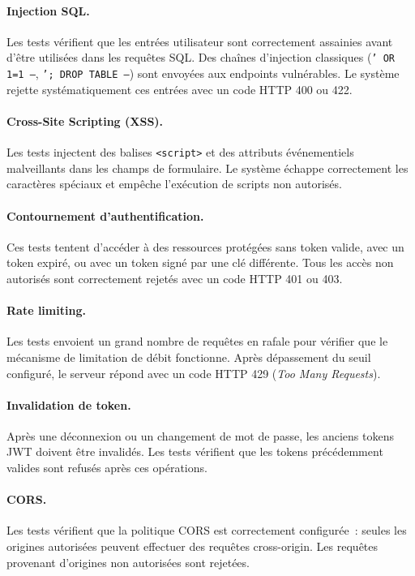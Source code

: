 \paragraph{Injection SQL.}
Les tests v\'{e}rifient que les entr\'{e}es utilisateur sont correctement
assainies avant d'\^{e}tre utilis\'{e}es dans les requ\^{e}tes SQL. Des cha\^{i}nes
d'injection classiques (\texttt{' OR 1=1 --}, \texttt{'; DROP TABLE --})
sont envoy\'{e}es aux endpoints vuln\'{e}rables. Le syst\`{e}me rejette
syst\'{e}matiquement ces entr\'{e}es avec un code HTTP 400 ou 422.

\paragraph{Cross-Site Scripting (XSS).}
Les tests injectent des balises \texttt{<script>} et des attributs
\'{e}v\'{e}nementiels malveillants dans les champs de formulaire. Le syst\`{e}me
\'{e}chappe correctement les caract\`{e}res sp\'{e}ciaux et emp\^{e}che
l'ex\'{e}cution de scripts non autoris\'{e}s.

\paragraph{Contournement d'authentification.}
Ces tests tentent d'acc\'{e}der \`{a} des ressources prot\'{e}g\'{e}es sans token
valide, avec un token expir\'{e}, ou avec un token sign\'{e} par une cl\'{e}
diff\'{e}rente. Tous les acc\`{e}s non autoris\'{e}s sont correctement rejet\'{e}s
avec un code HTTP 401 ou 403.

\paragraph{Rate limiting.}
Les tests envoient un grand nombre de requ\^{e}tes en rafale pour v\'{e}rifier
que le m\'{e}canisme de limitation de d\'{e}bit fonctionne. Apr\`{e}s d\'{e}passement
du seuil configur\'{e}, le serveur r\'{e}pond avec un code HTTP 429
(\textit{Too Many Requests}).

\paragraph{Invalidation de token.}
Apr\`{e}s une d\'{e}connexion ou un changement de mot de passe, les anciens
tokens JWT doivent \^{e}tre invalid\'{e}s. Les tests v\'{e}rifient que les tokens
pr\'{e}c\'{e}demment valides sont refus\'{e}s apr\`{e}s ces op\'{e}rations.

\paragraph{CORS.}
Les tests v\'{e}rifient que la politique CORS est correctement configur\'{e}e~:
seules les origines autoris\'{e}es peuvent effectuer des requ\^{e}tes
cross-origin. Les requ\^{e}tes provenant d'origines non autoris\'{e}es sont
rejet\'{e}es.

